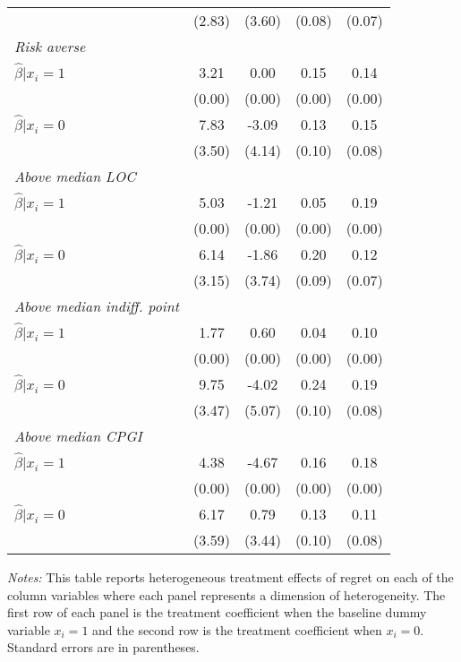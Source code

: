 \begin{table}[h]
{\begin{threeparttable}
\begin{tabular}{l*{4}{c}}
                &   (2.83)&   (3.60)&   (0.08)&   (0.07)\\
\textit{Risk averse}&         &         &         &         \\
\hspace{0.5cm} \(\hat\beta|x_i=1\)&     3.21&     0.00&     0.15&     0.14\\
                &   (0.00)&   (0.00)&   (0.00)&   (0.00)\\
\hspace{0.5cm} \(\hat\beta|x_i=0\)&     7.83&    -3.09&     0.13&     0.15\\
                &   (3.50)&   (4.14)&   (0.10)&   (0.08)\\
\textit{Above median LOC}&         &         &         &         \\
\hspace{0.5cm} \(\hat\beta|x_i=1\)&     5.03&    -1.21&     0.05&     0.19\\
                &   (0.00)&   (0.00)&   (0.00)&   (0.00)\\
\hspace{0.5cm} \(\hat\beta|x_i=0\)&     6.14&    -1.86&     0.20&     0.12\\
                &   (3.15)&   (3.74)&   (0.09)&   (0.07)\\
\textit{Above median indiff. point}&         &         &         &         \\
\hspace{0.5cm} \(\hat\beta|x_i=1\)&     1.77&     0.60&     0.04&     0.10\\
                &   (0.00)&   (0.00)&   (0.00)&   (0.00)\\
\hspace{0.5cm} \(\hat\beta|x_i=0\)&     9.75&    -4.02&     0.24&     0.19\\
                &   (3.47)&   (5.07)&   (0.10)&   (0.08)\\
\textit{Above median CPGI}&         &         &         &         \\
\hspace{0.5cm} \(\hat\beta|x_i=1\)&     4.38&    -4.67&     0.16&     0.18\\
                &   (0.00)&   (0.00)&   (0.00)&   (0.00)\\
\hspace{0.5cm} \(\hat\beta|x_i=0\)&     6.17&     0.79&     0.13&     0.11\\
                &   (3.59)&   (3.44)&   (0.10)&   (0.08)\\
\bottomrule \end{tabular} \begin{tablenotes}[flushleft] \footnotesize \item \emph{Notes:} This table reports heterogeneous treatment effects of regret on each of the column variables where each panel represents a dimension of heterogeneity. The first row of each panel is the treatment coefficient when the baseline dummy variable \(x_i = 1\) and the second row is the treatment coefficient when \(x_i = 0\). Standard errors are in parentheses. \end{tablenotes} \end{threeparttable} } \end{table}
